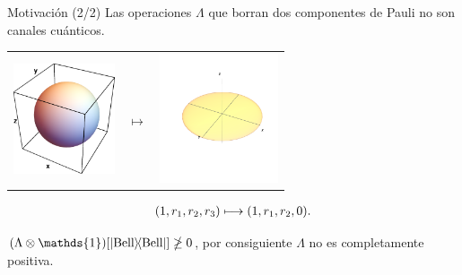 \documentclass[xcolor=dvipsnames,presentation]{beamer}%
\begin{document}
\begin{frame}{Motivación (2/2)}
	\only<1>{\alert{No.}}
	Las operaciones $\Lambda$ que borran dos componentes de Pauli no 
	son canales cuánticos.
	\begin{center}
	\begin{tabular}{m{2.5cm} m{1.3cm} m{2.5cm}}
		\includegraphics[width=3cm]{unit_sph}
		& \hfill \LARGE{$\longmapsto$}
		& \includegraphics[width=3.5cm]{unit_disk_xy}
	\end{tabular}
	\end{center}
	\vspace{-1cm}
	\begin{align*}
	\qty(1,r_1,r_2,r_3)\longmapsto\qty(1,r_1,r_2,0).
	\end{align*}
	
	\alert{$\qty(\Lambda\otimes \mathds{1})\qty[\dyad{\text{Bell}}{\text{Bell}}]\ngeq0$, 
	por consiguiente	$\Lambda$ no es completamente positiva.}
		
	\vspace{.5cm}
\end{frame}
\end{document}

